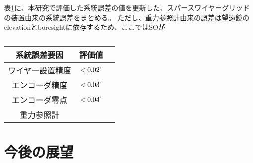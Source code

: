 \documentclass[../../main.tex]{subfiles}
\begin{document}
表\ref{}に、本研究で評価した系統誤差の値を更新した、スパースワイヤーグリッドの装置由来の系統誤差をまとめる。
ただし、重力参照計由来の誤差は望遠鏡のelevationとboresightに依存するため、ここではSOが
\begin{table}
    \centering
    \caption{}
    \begin{tabular}{ccc}
        \hline\hline
        系統誤差要因 & 評価値 \\
        \hline
        ワイヤー設置精度 & $<0.02\tcdegree$ \\
        エンコーダ精度 & $<0.03\tcdegree$ \\
        エンコーダ零点 & $<0.04\tcdegree$ \\
        重力参照計 & 
    \end{tabular}
    
\end{table}





\section{今後の展望}
\end{document}
